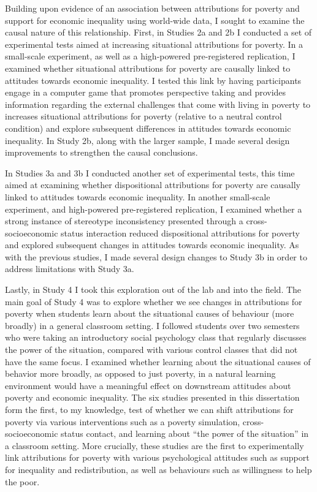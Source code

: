 \documentclass{sfuthesis}
\begin{document}
Building upon evidence of an association between attributions for poverty and support for economic inequality using world-wide data, I sought to examine the causal nature of this relationship. First, in Studies 2a and 2b I conducted a set of experimental tests aimed at increasing situational attributions for poverty. In a small-scale experiment, as well as a high-powered pre-registered replication, I examined whether situational attributions for poverty are causally linked to attitudes towards economic inequality. I tested this link by having participants engage in a computer game that promotes perspective taking and provides information regarding the external challenges that come with living in poverty to increases situational attributions for poverty (relative to a neutral control condition) and explore subsequent differences in attitudes towards economic inequality. In Study 2b, along with the larger sample, I made several design improvements to strengthen the causal conclusions. 

In Studies 3a and 3b I conducted another set of experimental tests, this time aimed at examining whether dispositional attributions for poverty are causally linked to attitudes towards economic inequality. In another small-scale experiment, and high-powered pre-registered replication, I examined whether a strong instance of stereotype inconsistency presented through a cross-socioeconomic status interaction reduced dispositional attributions for poverty and explored subsequent changes in attitudes towards economic inequality. As with the previous studies, I made several design changes to Study 3b in order to address limitations with Study 3a.

Lastly, in Study 4 I took this exploration out of the lab and into the field. The main goal of Study 4 was to explore whether we see changes in attributions for poverty when students learn about the situational causes of behaviour (more broadly) in a general classroom setting. I followed students over two semesters who were taking an introductory social psychology class that regularly discusses the power of the situation, compared with various control classes that did not have the same focus. I examined whether learning about the situational causes of behavior more broadly, as opposed to just poverty, in a natural learning environment would have a meaningful effect on downstream attitudes about poverty and economic inequality. 
The six studies presented in this dissertation form the first, to my knowledge, test of whether we can shift attributions for poverty via various interventions such as a poverty simulation, cross-socioeconomic status contact, and learning about “the power of the situation” in a classroom setting. More crucially, these studies are the first to experimentally link attributions for poverty with various psychological attitudes such as support for inequality and redistribution, as well as behaviours such as willingness to help the poor.
\end{document}
